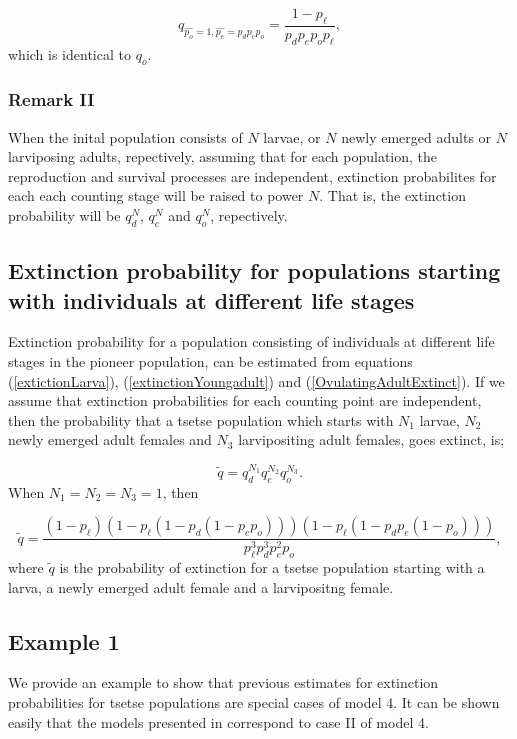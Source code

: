 \documentclass[smallextended]{svjour3}
\begin{document}
$$q_{\hat{p_o}=1,\hat{p_e}=p_{d}p_{e}p_{o}} = \frac{1-p_{\ell}}{p_{d}p_{e}p_{o}p_{\ell}},$$ 
which is identical to $q_{o}.$
\subsubsection*{\bf Remark II}
When the inital population consists of $N$ larvae, or $N$ newly emerged adults or $N$ larviposing adults, repectively, assuming that for each population, the reproduction and survival processes are independent, extinction probabilites for each each counting stage will be raised to power $N$. That is, the extinction probability will be $q_d^N$, $q_e^N$ and $q_o^N$, repectively.  


\subsection{Extinction probability for  populations starting with individuals at different life stages}
 Extinction probability for a population consisting of individuals at different life stages in the pioneer population, can be estimated  from equations (\ref{extictionLarva}), (\ref{extinctionYoungadult}) and (\ref{OvulatingAdultExtinct}). If we assume that extinction probabilities for each counting point are independent, then the probability that a tsetse population which starts with $N_1$ larvae, $N_2$ newly emerged adult females and $N_3$ larvipositing adult females, goes extinct, is; 


$$\tilde{q} = q_{d}^{N_1}q_{e}^{N_2}q_{o}^{N_3}.$$ When $N_1 = N_2 =N_3=1$, then

\begin{equation}
\label{jointextinction}
\tilde{q} = \frac{(1-p_{\ell})(1-p_{\ell}(1 - p_{d}(1 - p_{e}p_{o})))(1- p_{\ell}(1 -p_{d}p_{e}(1- p_{o})))}{p_{\ell}^{3}p_{d}^{3}p_{e}^{2}p_{o}},
\end{equation} 
where $\tilde{q}$ is the probability of extinction for a tsetse population starting with a larva, a newly emerged adult female and a larvipositng female.  

\subsection{Example 1}

We provide an example to show that previous estimates for extinction probabilities for tsetse populations are special cases of model 4. It can be shown easily that the models presented in \cite{Hargrove2005a,Kajunguri2019,Are2019} correspond to case II of model 4. 
\end{document}
